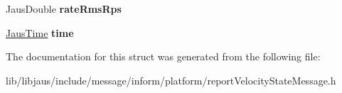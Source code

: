 \begin{DoxyCompactItemize}
\item 
\hypertarget{struct_report_velocity_state_message_struct_a7901aa23b0313c5c9c300dc2cb924265}{\-Jaus\-Double {\bfseries rate\-Rms\-Rps}}\label{struct_report_velocity_state_message_struct_a7901aa23b0313c5c9c300dc2cb924265}

\item 
\hypertarget{struct_report_velocity_state_message_struct_aab44d13e288617f73984cef61271a51e}{\hyperlink{struct_jaus_time_struct}{\-Jaus\-Time} {\bfseries time}}\label{struct_report_velocity_state_message_struct_aab44d13e288617f73984cef61271a51e}

\end{DoxyCompactItemize}


\-The documentation for this struct was generated from the following file\-:\begin{DoxyCompactItemize}
\item 
lib/libjaus/include/message/inform/platform/report\-Velocity\-State\-Message.\-h\end{DoxyCompactItemize}
